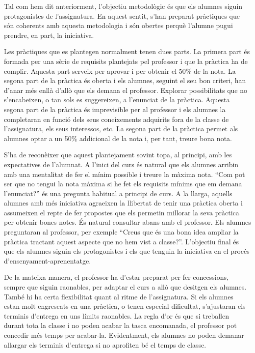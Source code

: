 \documentclass[catalan, a4paper, 12pt, titlepage]{article}
\begin{document}
Tal com hem dit anteriorment, l'objectiu metodològic és que els alumnes siguin protagonistes de l'assignatura.
En aquest sentit, s'han preparat pràctiques que són coherents amb aquesta metodologia i són obertes perquè l'alumne pugui prendre, en part, la iniciativa.

Les pràctiques que es plantegen normalment tenen dues parts.
La primera part és formada per una sèrie de requisits plantejats pel professor i que la pràctica ha de complir. 
Aquesta part serveix per aprovar i per obtenir el 50\% de la nota.
La segona part de la pràctica és oberta i els alumnes, seguint el seu bon criteri, han d'anar més enllà d'allò que els demana el professor.
Explorar possibilitats que no s'encabeixen, o tan sols es suggereixen, a l'enunciat de la pràctica.
Aquesta segona part de la pràctica és imprevisible per al professor i els alumnes la completaran en funció dels seus coneixements adquirits fora de la classe de l'assignatura, els seus interessos, etc.
La segona part de la pràctica permet als alumnes optar a un 50\% addicional de la nota i, per tant, treure bona nota.

S'ha de reconèixer que aquest plantejament sovint topa, al principi, amb les expectatives de l'alumnat.
A l'inici del curs és natural que els alumnes arribin amb una mentalitat de fer el mínim possible i treure la màxima nota.
``Com pot ser que no tengui la nota màxima si he fet els requisits mínims que em demana l'enunciat?'' és una pregunta habitual a principi de curs.
A la llarga, aquells alumnes amb més iniciativa agraeixen la llibertat de tenir una pràctica oberta i assumeixen el repte de fer propostes que els permetin millorar la seva pràctica per obtenir bones notes.
És natural consultar abans amb el professor. 
Els alumnes preguntaran al professor, per exemple ``Creus que és una bona idea ampliar la pràctica tractant aquest aspecte que no hem vist a classe?''.
L'objectiu final és que els alumnes siguin els protagonistes i els que tenguin la iniciativa en el procés d'ensenyament-aprenentatge.

De la mateixa manera, el professor ha d'estar preparat per fer concessions, sempre que siguin raonables, per adaptar el curs a allò que desitgen els alumnes.
També hi ha certa flexibilitat quant al ritme de l'assignatura. 
Si els alumnes estan molt engrescats en una pràctica, o tenen especial dificultat, s'ajustaran els terminis d'entrega en uns límits raonables.
La regla d'or és que si treballen durant tota la classe i no poden acabar la tasca encomanada, el professor pot concedir més temps per acabar-la.
Evidentment, els alumnes no poden demanar allargar els terminis d'entrega si no aprofiten bé el temps de classe.
\end{document}
